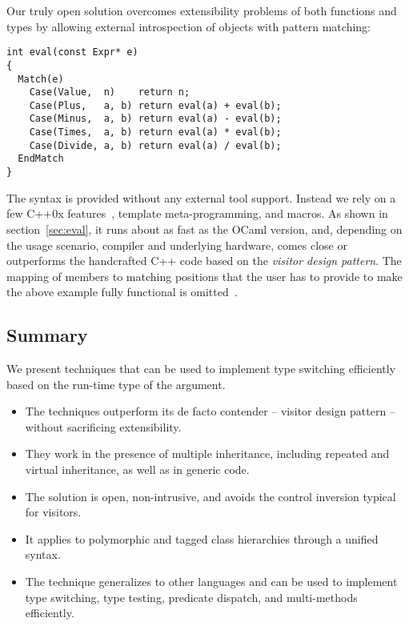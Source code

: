 Our truly open solution overcomes extensibility problems of both functions and 
types by allowing external introspection of objects with pattern matching:

\begin{lstlisting}[keepspaces,columns=flexible]
int eval(const Expr* e)
{
  Match(e)
    Case(Value,  n)    return n;
    Case(Plus,   a, b) return eval(a) + eval(b);
    Case(Minus,  a, b) return eval(a) - eval(b);
    Case(Times,  a, b) return eval(a) * eval(b);
    Case(Divide, a, b) return eval(a) / eval(b);
  EndMatch
}
\end{lstlisting}

\noindent
The syntax is provided without any external tool support. Instead we rely on a 
few C++0x features~\cite{C++0x}, template meta-programming, and macros. As shown 
in section~\ref{sec:eval}, it runs about as fast as the OCaml version, and, 
depending on the usage scenario, compiler and underlying hardware, comes close 
or outperforms the handcrafted C++ code based on the \emph{visitor design pattern}.
The mapping of members to matching positions that the user has to provide to 
make the above example fully functional is omitted~\cite{TR}.

\subsection{Summary}

We present techniques that can be used to implement type switching efficiently 
based on the run-time type of the argument.

  \begin{itemize}
  \setlength{\itemsep}{0pt}
  \setlength{\parskip}{0pt}
  \item The techniques outperform its de facto contender -- visitor design 
        pattern -- without sacrificing extensibility.
  \item They work in the presence of multiple inheritance, including repeated and 
        virtual inheritance, as well as in generic code.
  \item The solution is open, non-intrusive, and avoids the control inversion 
        typical for visitors. 
  \item It applies to polymorphic and tagged class hierarchies through a unified 
        syntax. 
  \item The technique generalizes to other languages and can be used to 
        implement type switching, type testing, predicate dispatch, and 
        multi-methods efficiently.
  \end{itemize}

